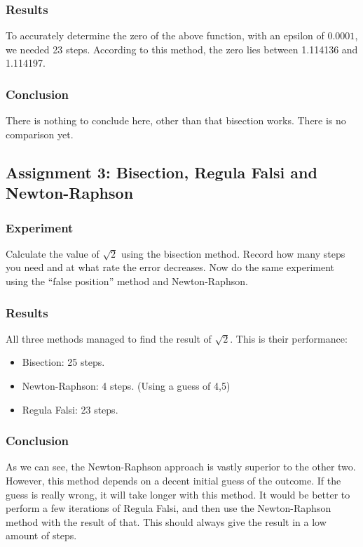 \documentclass[a4paper,10pt]{article}
\begin{document}
  \subsubsection{Results}
  To accurately determine the zero of the above function, with an epsilon of $0.0001$, we needed 23 steps. According to this method, the zero lies between 1.114136 and 1.114197.
  
  \subsubsection{Conclusion}
  There is nothing to conclude here, other than that bisection works. There is no comparison yet.

  \subsection{Assignment 3: Bisection, Regula Falsi and Newton-Raphson}

  \subsubsection{Experiment}
                        
  Calculate the value of $\sqrt 2$ using the bisection method.
  Record how many steps you need and at what rate the error decreases. Now do the same experiment
  using the ``false position'' method and Newton-Raphson.
  
  \subsubsection{Results}
  All three methods managed to find the result of $\sqrt 2$. This is their performance:
  \begin{itemize}
    \item Bisection: 25 steps.
    \item Newton-Raphson: 4 steps. (Using a guess of 4,5)
    \item Regula Falsi: 23 steps.
  \end{itemize}
  
  \subsubsection{Conclusion}
  As we can see, the Newton-Raphson approach is vastly superior to the other two. However, this method depends on a decent initial guess of the outcome. If the guess is really wrong, it will take longer with this method. It would be better to perform a few iterations of Regula Falsi, and then use the Newton-Raphson method with the result of that. This should always give the result in a low amount of steps.
\end{document}
